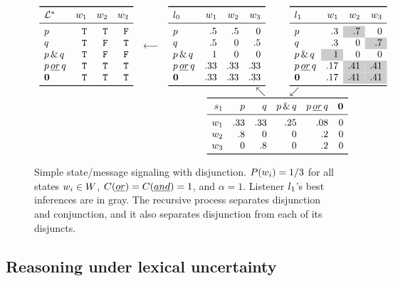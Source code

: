 \documentclass[12pt,twoside]{article}
\renewcommand{\_}{\textbf{\textunderscore\hspace{-4pt}\textunderscore\hspace{-3pt}\textunderscore\hspace{-4pt}\textunderscore}\hspace{0.5pt}}			%
\begin{document}
\begin{figure}[tp]
  \centering
  \setlength{\arraycolsep}{3pt} 
  $\begin{array}[b]{c c r@{\hspace{25pt}}l}
     \listenerMatrix%
     {\LexStar}%
     {\True & \True  & \False}%
     {\True & \False & \True}%
     {\True & \False & \False}%
     {\True & \True  & \True}%
     {\True & \True  & \True}%
     &
     \longleftarrow
     &
     \listenerMatrix%
     {\listenerZero}%
     { .5 &  .5 &   0}%
     { .5 &   0 &  .5}%
     {1   &   0 &   0}%
     {.33 & .33 & .33}%
     {.33 & .33 & .33}%
     &
     \listenerMatrix%
     {\listenerOne}%
     { .3 & \graycell{.7} &   0}%
     { .3 &   0 & \graycell{.7}}%
     {\graycell{1} &   0 &   0}%
     { .17 & \graycell{.41} & \graycell{.41}}%
     { .17 & \graycell{.41} & \graycell{.41}}%
   \\
   && \nwarrow & \swarrow
   \\
   &&
   \multicolumn{2}{c}{
      \speakerMatrix%
      {\speakerOne}%
      {.33 & .33 & .25 & .08 & 0}%
      {.8 & 0   &   0 & .2 & 0}%
      {  0 & .8 &   0 & .2 & 0}%
   }
   \end{array}$   
   \caption{Simple state/message signaling with disjunction. 
     $P(w_{i}) = 1/3$ for all states $w_{i} \in W$,
     $C(\emph{or}) = C(\emph{and}) = 1$, and 
     $\alpha = 1$. 
     Listener $l_{1}$'s best inferences are in gray. 
     The recursive process separates disjunction and conjunction, and 
     it also separates disjunction from each of its disjuncts.}
  \label{fig:rsa-disj}
\end{figure}


\subsection{Reasoning under lexical uncertainty}\label{sec:full}
\end{document}

